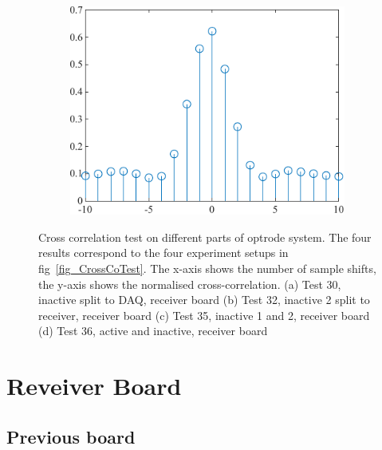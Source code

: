 \begin{figure}[H]
\begin{subfigure}{.5\textwidth}
  \caption{}
  \label{fig_CrossCorrelation35}
\end{subfigure}%
\begin{subfigure}{.5\textwidth}
  \centering
  \includegraphics[width=0.8\linewidth]{4-ANC_Sys/CrossCorrelation 36.pdf}
  \caption{}
  \label{fig_CrossCorrelation36}
\end{subfigure}
\caption{Cross correlation test on different parts of optrode system. The four results correspond to the four experiment setups in fig~\ref{fig_CrossCoTest}. The x-axis shows the number of sample shifts, the y-axis shows the normalised cross-correlation. (a) Test 30, inactive split to DAQ, receiver board (b) Test 32, inactive 2 split to receiver, receiver board (c) Test 35, inactive 1 and 2, receiver board (d) Test 36, active and inactive, receiver board}
\label{fig_CrossCorrelationTest}
\end{figure}



\section{Reveiver Board}

\subsection{Previous board}

